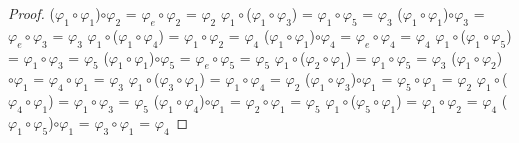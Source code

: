 \documentclass[10pt,a4paper,oneside]{article}
\begin{document}
\begin{proof}
				($\varphi_{1}\circ\varphi_{1}$)$\circ\varphi_{2}$ = $\varphi_{e}\circ\varphi_{2}$ = $\varphi_{2}$
				\newline
				\newline
				$\varphi_{1}\circ$($\varphi_{1}\circ\varphi_{3}$) = $\varphi_{1}\circ\varphi_{5}$ = $\varphi_{3}$
				\newline
				($\varphi_{1}\circ\varphi_{1}$)$\circ\varphi_{3}$ = $\varphi_{e}\circ\varphi_{3}$ = $\varphi_{3}$
				\newline
				\newline
				$\varphi_{1}\circ$($\varphi_{1}\circ\varphi_{4}$) = $\varphi_{1}\circ\varphi_{2}$ = $\varphi_{4}$
				\newline
				($\varphi_{1}\circ\varphi_{1}$)$\circ\varphi_{4}$ = $\varphi_{e}\circ\varphi_{4}$ = $\varphi_{4}$
				\newline
				\newline
				$\varphi_{1}\circ$($\varphi_{1}\circ\varphi_{5}$) = $\varphi_{1}\circ\varphi_{3}$ = $\varphi_{5}$
				\newline
				($\varphi_{1}\circ\varphi_{1}$)$\circ\varphi_{5}$ = $\varphi_{e}\circ\varphi_{5}$ = $\varphi_{5}$
				\newline
				\newline
				$\varphi_{1}\circ$($\varphi_{2}\circ\varphi_{1}$) = $\varphi_{1}\circ\varphi_{5}$ = $\varphi_{3}$
				\newline
				($\varphi_{1}\circ\varphi_{2}$)$\circ\varphi_{1}$ = $\varphi_{4}\circ\varphi_{1}$ = $\varphi_{3}$
				\newline
				\newline
				$\varphi_{1}\circ$($\varphi_{3}\circ\varphi_{1}$) = $\varphi_{1}\circ\varphi_{4}$ = $\varphi_{2}$
				\newline
				($\varphi_{1}\circ\varphi_{3}$)$\circ\varphi_{1}$ = $\varphi_{5}\circ\varphi_{1}$ = $\varphi_{2}$
				\newline
				\newline
				$\varphi_{1}\circ$($\varphi_{4}\circ\varphi_{1}$) = $\varphi_{1}\circ\varphi_{3}$ = $\varphi_{5}$
				\newline
				($\varphi_{1}\circ\varphi_{4}$)$\circ\varphi_{1}$ = $\varphi_{2}\circ\varphi_{1}$ = $\varphi_{5}$
				\newline
				\newline
				$\varphi_{1}\circ$($\varphi_{5}\circ\varphi_{1}$) = $\varphi_{1}\circ\varphi_{2}$ = $\varphi_{4}$
				\newline
				($\varphi_{1}\circ\varphi_{5}$)$\circ\varphi_{1}$ = $\varphi_{3}\circ\varphi_{1}$ = $\varphi_{4}$

\end{proof}
\end{document}
